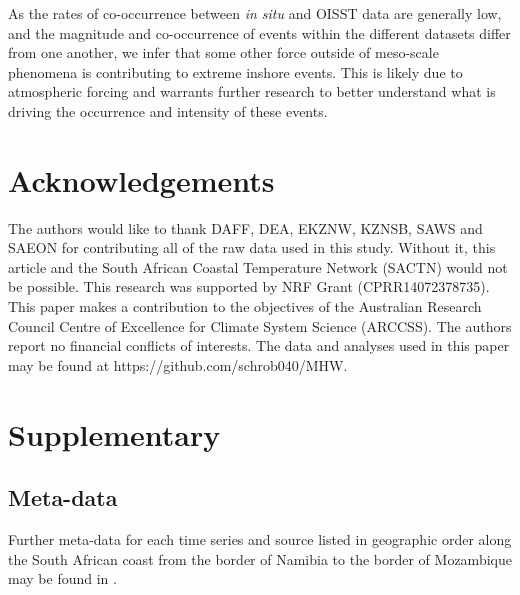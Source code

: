 \documentclass[a4paper,10pt,review]{elsarticle}
\begin{document}
As the rates of co-occurrence between \emph{in situ} and OISST data are generally low, and the magnitude and co-occurrence of events within the different datasets differ from one another, we infer that some other force outside of meso-scale phenomena is contributing to extreme inshore events. This is likely due to atmospheric forcing and warrants further research to better understand what is driving the occurrence and intensity of these events.

\section*{Acknowledgements}
The authors would like to thank DAFF, DEA, EKZNW, KZNSB, SAWS and SAEON for contributing all of the raw data used in this study. Without it, this article and the South African Coastal Temperature Network (SACTN) would not be possible. This research was supported by NRF Grant (CPRR14072378735). This paper makes a contribution to the objectives of the Australian Research Council Centre of Excellence for Climate System Science (ARCCSS). The authors report no financial conflicts of interests. The data and analyses used in this paper may be found at https://github.com/schrob040/MHW.

\newcommand{\beginsupplement}{%
        \setcounter{table}{0}
        \renewcommand{\thetable}{S\arabic{table}}%
        \setcounter{figure}{0}
        \renewcommand{\thefigure}{S\arabic{figure}}%
     }
\beginsupplement

\section*{Supplementary}
\subsection*{Meta-data}
Further meta-data for each time series and source listed in geographic order along the South African coast from the border of Namibia to the border of Mozambique may be found in .
\end{document}
